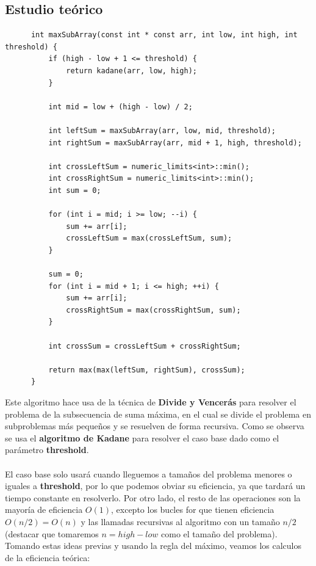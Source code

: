 \documentclass[11pt,openany]{book}
\begin{document}
\subsection{Estudio teórico}
\begin{lstlisting}
      int maxSubArray(const int * const arr, int low, int high, int threshold) {
          if (high - low + 1 <= threshold) {
              return kadane(arr, low, high);
          }
      
          int mid = low + (high - low) / 2;
      
          int leftSum = maxSubArray(arr, low, mid, threshold);
          int rightSum = maxSubArray(arr, mid + 1, high, threshold);
      
          int crossLeftSum = numeric_limits<int>::min();
          int crossRightSum = numeric_limits<int>::min();
          int sum = 0;
      
          for (int i = mid; i >= low; --i) {
              sum += arr[i];
              crossLeftSum = max(crossLeftSum, sum);
          }
      
          sum = 0;
          for (int i = mid + 1; i <= high; ++i) {
              sum += arr[i];
              crossRightSum = max(crossRightSum, sum);
          }
      
          int crossSum = crossLeftSum + crossRightSum;
      
          return max(max(leftSum, rightSum), crossSum);
      }
\end{lstlisting}
Este algoritmo hace usa de la técnica de \textbf{Divide y Vencerás} para resolver el problema de la subsecuencia de suma máxima, en el cual se divide el 
problema en subproblemas más pequeños y se resuelven de forma recursiva. Como se observa se usa el \textbf{algoritmo de Kadane} para resolver el caso base dado como el parámetro
\textbf{threshold}.\\ \\
El caso base solo usará cuando lleguemos a tamaños del problema menores o iguales a \textbf{threshold}, por lo que podemos obviar su eficiencia, ya que tardará
un tiempo constante en resolverlo. Por otro lado, el resto de las operaciones son la mayoría de eficiencia $O(1)$, excepto los bucles for que tienen eficiencia $O(n/2)=O(n)$ y las llamadas
recursivas al algoritmo con un tamaño $n/2$ (destacar que tomaremos $n=high-low$ como el tamaño del problema). Tomando estas ideas previas y usando la regla
del máximo, veamos los calculos de la eficiencia teórica:
\end{document}
